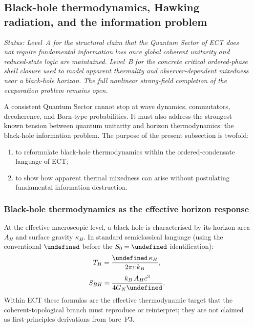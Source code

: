 \documentclass[11pt,a4paper]{article}
\let\hbar\undefined
\numberwithin{equation}{section}
\begin{document}
\subsection{Black-hole thermodynamics, Hawking radiation,
and the information problem}
\label{sec:qs_black_holes}\label{sec:no_exact_thermality}
\label{sec:critical_shell}
\label{sec:bh_information}

\textit{Status: Level~A for the structural claim that the Quantum
Sector of ECT does not require fundamental information loss once global
coherent unitarity and reduced-state logic are maintained.
Level~B for the concrete critical ordered-phase shell closure used to
model apparent thermality and observer-dependent mixedness near a
black-hole horizon.
The full nonlinear strong-field completion of the evaporation problem
remains open.}

\medskip
A consistent Quantum Sector cannot stop at wave dynamics, commutators,
decoherence, and Born-type probabilities.
It must also address the strongest known tension between quantum
unitarity and horizon thermodynamics: the black-hole information
problem.
The purpose of the present subsection is twofold:
\begin{enumerate}[label=(\roman*)]
  \item to reformulate black-hole thermodynamics within the
    ordered-condensate language of ECT;
  \item to show how apparent thermal mixedness can arise without
    postulating fundamental information destruction.
\end{enumerate}

\subsubsection*{Black-hole thermodynamics as the effective horizon response}

At the effective macroscopic level, a black hole is characterised by
its horizon area $A_H$ and surface gravity $\kappa_H$.
In standard semiclassical language (using the conventional $\hbar$
before the $S_0=\hbar$ identification):
\begin{equation}
  \label{eq:qs_Hawking_temp}
  T_H
  =
  \frac{\hbar\,\kappa_H}{2\pi c\,k_B},
\end{equation}
\begin{equation}
  \label{eq:qs_BH_entropy}
  S_{BH}
  =
  \frac{k_B\,A_H c^3}{4G_N\hbar}.
\end{equation}
Within ECT these formulas are the effective thermodynamic target that
the coherent-topological branch must reproduce or reinterpret; they are
not claimed as first-principles derivations from bare~P3.
\end{document}
